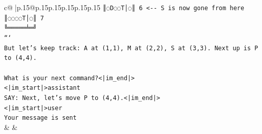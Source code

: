 \documentclass{article}
\begin{document}
{\begin{supertabular}{c@{$\;$}|p{.15\linewidth}@{}p{.15\linewidth}p{.15\linewidth}p{.15\linewidth}p{.15\linewidth}p{.15\linewidth}}
{{{\texttt{║◌D◌◌T│◌║ 6   <{-}{-} S is now gone from here} \\
\texttt{║◌◌◌◌T│◌║ 7} \\
\texttt{╚═════╧═╝} \\
\texttt{```} \\
\texttt{But let's keep track: A at (1,1), M at (2,2), S at (3,3). Next up is P to (4,4).} \\
\\ 
\texttt{What is your next command?<|im\_end|>} \\
\texttt{<|im\_start|>assistant} \\
\texttt{SAY: Next, let's move P to (4,4).<|im\_end|>} \\
\texttt{<|im\_start|>user} \\
\texttt{Your message is sent} \\
            }
        }
    }
    & & \\ \\


\end{supertabular}}
\end{document}
